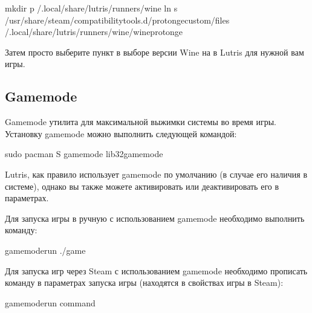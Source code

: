 \documentclass[letterpaper,10pt,russian,openany]{sphinxmanual}
\begin{document}
\begin{sphinxVerbatim}[commandchars=\\\{\}]
mkdir \PYGZhy{}p \PYGZti{}/.local/share/lutris/runners/wine
ln \PYGZhy{}s /usr/share/steam/compatibilitytools.d/proton\PYGZhy{}ge\PYGZhy{}custom/files \PYGZti{}/.local/share/lutris/runners/wine/wine\PYGZhy{}proton\PYGZhy{}ge
\end{sphinxVerbatim}

\sphinxAtStartPar
Затем просто выберите пункт в выборе версии Wine на  в Lutris для нужной вам игры.

\ignorespaces 

\subsection{Gamemode}
\label{\detokenize{source/linux-gaming:gamemode}}\label{\detokenize{source/linux-gaming:index-15}}\label{\detokenize{source/linux-gaming:id12}}
\sphinxAtStartPar
Gamemode \sphinxhyphen{} утилита для максимальной выжимки системы во время игры.
Установку gamemode можно выполнить следующей командой:

\begin{sphinxVerbatim}[commandchars=\\\{\}]
sudo pacman \PYGZhy{}S gamemode lib32\PYGZhy{}gamemode
\end{sphinxVerbatim}

\sphinxAtStartPar
Lutris, как правило использует gamemode по умолчанию (в случае его наличия в системе), однако вы также можете активировать или деактивировать его в параметрах.

\sphinxAtStartPar
Для запуска игры в ручную с использованием gamemode необходимо выполнить команду:

\begin{sphinxVerbatim}[commandchars=\\\{\}]
gamemoderun ./game
\end{sphinxVerbatim}

\sphinxAtStartPar
Для запуска игр через Steam с использованием gamemode необходимо прописать команду в параметрах запуска игры (находятся в свойствах игры в Steam):

\begin{sphinxVerbatim}[commandchars=\\\{\}]
gamemoderun \PYGZpc{}command\PYGZpc{}
\end{sphinxVerbatim}
\end{document}
